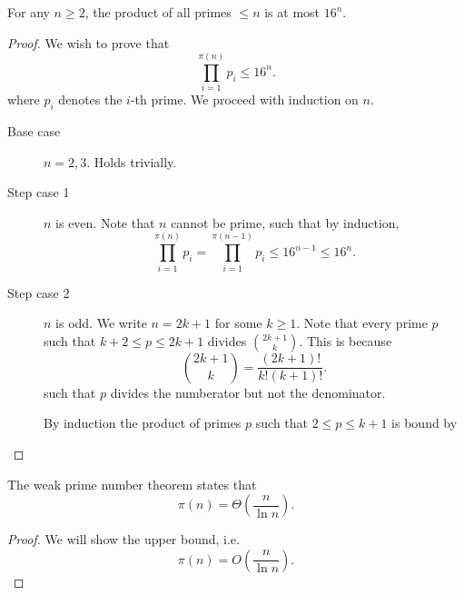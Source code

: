 \begin{lemma}
	For any \( n\ge 2 \), the product of all primes \( \le n \) is at most \( 16^{n}  \).
\end{lemma}
\begin{proof}
	We wish to prove that \[
		\prod_{i=1}^{\pi (n)}p_i \le 16^{n}  
	.\] where \( p_i \) denotes the \( i \)-th prime. We proceed with induction on \( n \).
	\begin{description}
		\item[Base case] \( n=2,3 \). Holds trivially.
		\item[Step case 1] \( n \) is even. Note that \( n \) cannot be prime, such that by induction, \[
			\prod_{i=1}^{\pi (n)} p_i =  \prod_{i=1}^{\pi (n-1)} p_i \le  16^{n-1} \le 16^{n} 
		.\] 
		\item[Step case 2] \( n \) is odd. We write \( n=2k+1 \) for some \( k \ge 1 \). Note that every prime \( p \) such that \( k+2 \le p \le 2k + 1 \) divides \( \binom{2k+1}{k} \). This is because \[
				\binom{2k+1}{k} = \frac{(2k+1)!}{k!(k+1)!}
		.\] such that \( p \) divides the numberator but not the denominator. 

		By induction the product of primes \( p \) such that \( 2 \le p \le k+1 \) is bound by 
	\end{description}
\end{proof}

\begin{theorem}
	The weak prime number theorem states that \[ \pi (n) = \Theta \left(\frac{n}{\ln n}\right) .\]
\end{theorem}
\begin{proof}
	We will show the upper bound, i.e. \[
		\pi (n) = O\left(\frac{n}{\ln n}\right)
	.\] 
\end{proof}
